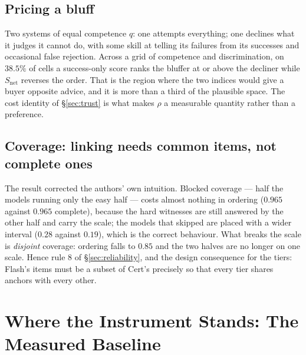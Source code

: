 \documentclass[11pt]{article}
\theoremstyle{definition}
\begin{document}
\subsection{Pricing a bluff}\label{sec:bluff}

Two systems of equal competence $q$: one attempts everything; one declines what it judges it cannot do, with some skill at telling its failures from its successes and occasional false rejection. Across a grid of competence and discrimination, on $38.5\%$ of cells a success-only score ranks the bluffer at or above the decliner while $S_{\mathrm{net}}$ reverses the order. That is the region where the two indices would give a buyer opposite advice, and it is more than a third of the plausible space. The cost identity of \S\ref{sec:trust} is what makes $\rho$ a measurable quantity rather than a preference.

\subsection{Coverage: linking needs common items, not complete ones}\label{sec:coverage}

\begin{table}[!htbp]\centering\small

\caption{Ordering recovery and interval width under four coverage regimes, twelve models and 160 witnesses. ``SE, partial models'' is the interval on the models that skipped part of the suite.}
\label{tab:coverage}
\end{table}

The result corrected the authors' own intuition. Blocked coverage --- half the models running only the easy half --- costs almost nothing in ordering ($0.965$ against $0.965$ complete), because the hard witnesses are still answered by the other half and carry the scale; the models that skipped are placed with a wider interval ($0.28$ against $0.19$), which is the correct behaviour. What breaks the scale is \emph{disjoint} coverage: ordering falls to $0.85$ and the two halves are no longer on one scale. Hence rule 8 of \S\ref{sec:reliability}, and the design consequence for the tiers: Flash's items must be a subset of Cert's precisely so that every tier shares anchors with every other.

\section{Where the Instrument Stands: The Measured Baseline}\label{sec:baseline}
\end{document}
